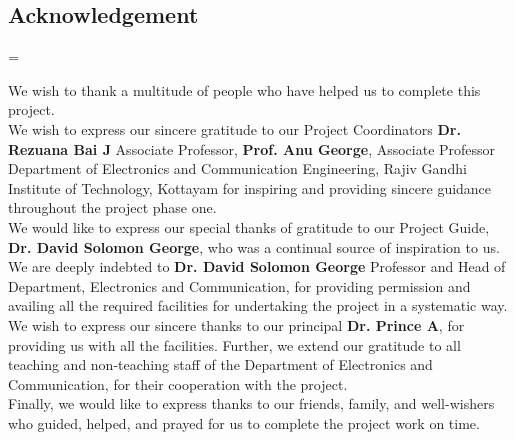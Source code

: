 \begin{center}

    \vspace{6pt}
    \vspace{20pt}

    \begin{minipage} {0.9\textwidth}

        \chapter*{Acknowledgement}


        \setlength{\parindent}{10pt}
        \setlength{\parskip}{10pt}

        \emergencystretch=\maxdimen

        \noindent We wish to thank a multitude of people who have helped us to complete this project.
        \\


        \noindent We wish to express our sincere gratitude to our Project Coordinators \textbf{Dr. Rezuana Bai J}
        Associate Professor, \textbf{Prof. Anu George}, Associate Professor Department of Electronics
        and Communication Engineering, Rajiv Gandhi Institute of Technology, Kottayam
        for inspiring and providing sincere guidance throughout the project phase one.
        \\


        \noindent We would like to express our special thanks of gratitude to our Project Guide,
        \textbf{Dr. David Solomon George}, who was a continual source of inspiration to us. We are
        deeply indebted to \textbf{Dr. David Solomon George} Professor and Head of Department,
        Electronics and Communication, for providing permission and availing all the required
        facilities for undertaking the project in a systematic way. We wish to express our sincere
        thanks to our principal \textbf{Dr. Prince A}, for providing us with all the facilities. Further,
        we extend our gratitude to all teaching and non-teaching staff of the Department of Electronics
        and Communication, for their cooperation with the project.
        \\


        \noindent Finally, we would like to express thanks to our friends, family, and well-wishers who
        guided, helped, and prayed for us to complete the project work on time.

    \end{minipage}

\end{center}

\pagebreak
